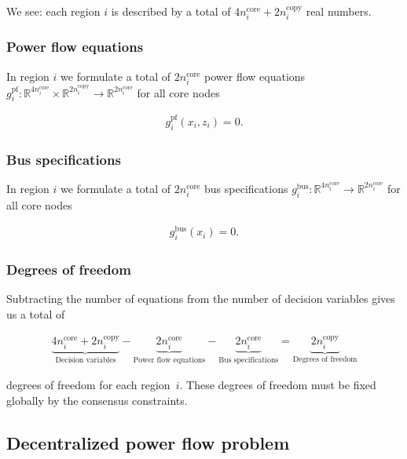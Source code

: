 \documentclass{article}
\newcommand{\n}{n}
\newcommand{\ncore}{\n^\text{core}}
\newcommand{\ncopy}{\n^\text{copy}}
\newcommand{\stateCore}{x}
\newcommand{\stateCopy}{z}
\newcommand{\pf}{g^{\text{pf}}}
\newcommand{\busspecs}{g^{\text{bus}}}
\begin{document}
We see: each region $i$ is described by a total of $4 \ncore_i + 2 \ncopy_i$ real numbers.

\subsubsection{Power flow equations}
In region $i$ we formulate a total of $2 \ncore_i$ power flow equations $\pf_i \colon \mathbb{R}^{4 \ncore_i} \times \mathbb{R}^{2 \ncopy_i} \rightarrow \mathbb{R}^{2 \ncore_i}$ for all core nodes

\begin{align}
    \pf_i( \stateCore_i, \stateCopy_i) = 0.
\end{align}

\subsubsection{Bus specifications}
In region $i$ we formulate a total of $2 \ncore_i$ bus specifications $\busspecs_i \colon \mathbb{R}^{4 \ncore_i} \rightarrow \mathbb{R}^{2 \ncore_i}$ for all core nodes

\begin{align}
    \busspecs_i( \stateCore_i) = 0.
\end{align}

\subsubsection{Degrees of freedom}

Subtracting the number of equations from the number of decision variables gives us a total of

\begin{align}
    \underbrace{4 \ncore_i + 2 \ncopy_i}_{\text{Decision variables}} - \underbrace{2 \ncore_i}_{\text{Power flow equations}} - \underbrace{2 \ncore_i}_{\text{Bus specifications}} = \underbrace{2 \ncopy_i}_{\text{Degrees of freedom}}
\end{align}

degrees of freedom for each region~$i$.
These degrees of freedom must be fixed globally by the consensus constraints.



\subsection{Decentralized power flow problem}
\end{document}
